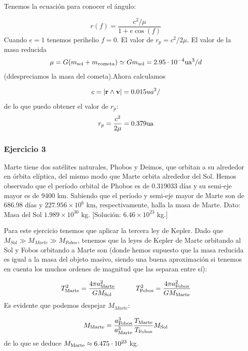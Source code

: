 	Tenemos la ecuación para conocer el ángulo:

	\begin{equation}
		r(f) = \frac{c^2/ \mu}{1+e\cos(f)}
	\end{equation}
	Cuando $e=1$ tenemos perihelio $f=0$. El valor de $r_p = c^2/2\mu$. El valor de la masa reducida $$\mu=G(m_{\text{sol}}+m_{\text{cometa}})\simeq G m_{\text{sol}} = 2.95\cdot 10^{-4} \text{ua}^3/d$$(ddespreciamos la masa del cometa).Ahora calculamos

	\begin{equation}
		c=|\rn\wedge\vn|=0.015 \*ua^2/
	\end{equation}
	de lo que puedo obtener el valor de $r_p$:
	\begin{equation}
		r_p = \frac{c^2}{2\mu} = 0.379 \text{ua}
	\end{equation}



	\begin{Enunciado}
		\subsubsection{Ejercicio 3}
	Marte tiene dos satélites naturales, Phobos y Deimos, que orbitan a su alrededor en órbita elíptica, del mismo modo que Marte orbita alrededor del Sol. Hemos observado que el período orbital de Phobos es de 0.319033 días y su semi-eje mayor es de 9400 km. Sabiendo que el período y semi-eje mayor de Marte son de 686.98 días y $227.956\times10^6$ km, respectivamente, halla la masa de Marte. Dato: Masa del Sol $1.989 \times 10^{30}$ kg. [Solución: $6.46 \times 10^{23}$ kg.]
\end{Enunciado}

    Para este ejercicio tenemos que aplicar la tercera ley de Kepler. Dado que $M_{Sol}\gg M_{Marte} \gg M_{Fobos}$, tenemos que la leyes de Kepler de Marte orbitando al Sol y Fobos orbitando a Marte son (donde hemos supuesto que la masa reducida es igual a la masa del objeto masivo, siendo una buena aproximación si tenemos en cuenta los muchos ordenes de magnitud que las separan entre sí):

    \begin{equation}
        T_{\text{Marte}}^2 = \frac{4\pi a_{\text{Marte}}^2}{GM_{\text{Sol}}}   \quad \quad \quad
        T_{\text{Fobos}}^2 = \frac{4\pi a_{\text{Fobos}}^2}{GM_{\text{Marte}}}         
    \end{equation}
    Es evidente que podemos despejar $M_{Marte}$:

    \begin{equation}
        M_{\text{Marte}} = \frac{a_{\text{Fobos}}^3}{a_{\text{Marte}}^3} \frac{T_{\text{Marte}}}{T_{\text{Fobos}}} M_{\text{Sol}}
    \end{equation}
    de lo que se deduce $M_{\text{Marte}}\approx 6.475 \cdot 10^{23}$ kg.



